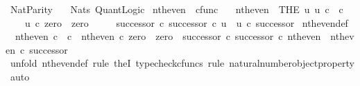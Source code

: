 %
\begin{isabellebody}%
%
%
\isadelimtheory
%
\endisadelimtheory
%
\isatagtheory
{}\isamarkupfalse%
\ Nat{\isacharunderscore}{\kern0pt}Parity\isanewline
\ \ \ Nats\ Quant{\isacharunderscore}{\kern0pt}Logic\isanewline
{}%
\endisatagtheory
{\isafoldtheory}%
%
\isadelimtheory
%
\endisadelimtheory
%
\isadelimdocument
%
\endisadelimdocument
%
\isatagdocument
%
\isamarkuptrue%
%
\endisatagdocument
{\isafolddocument}%
%
\isadelimdocument
%
\endisadelimdocument
{}\isamarkupfalse%
\ nth{\isacharunderscore}{\kern0pt}even\ {\isacharcolon}{\kern0pt}{\isacharcolon}{\kern0pt}\ {\isachardoublequoteopen}cfunc{\isachardoublequoteclose}\ \isanewline
\ \ {\isachardoublequoteopen}nth{\isacharunderscore}{\kern0pt}even\ {\isacharequal}{\kern0pt}\ {\isacharparenleft}{\kern0pt}THE\ u{\isachardot}{\kern0pt}\ u{\isacharcolon}{\kern0pt}\ {\isasymnat}\isactrlsub c\ {\isasymrightarrow}\ {\isasymnat}\isactrlsub c\ {\isasymand}\ \isanewline
\ \ \ \ u\ {\isasymcirc}\isactrlsub c\ zero\ {\isacharequal}{\kern0pt}\ zero\ {\isasymand}\isanewline
\ \ \ \ {\isacharparenleft}{\kern0pt}successor\ {\isasymcirc}\isactrlsub c\ successor{\isacharparenright}{\kern0pt}\ {\isasymcirc}\isactrlsub c\ u\ {\isacharequal}{\kern0pt}\ u\ {\isasymcirc}\isactrlsub c\ successor{\isacharparenright}{\kern0pt}{\isachardoublequoteclose}\isanewline
\isanewline
{}\isamarkupfalse%
\ nth{\isacharunderscore}{\kern0pt}even{\isacharunderscore}{\kern0pt}def{}{\isacharcolon}{\kern0pt}\isanewline
\ \ {\isachardoublequoteopen}nth{\isacharunderscore}{\kern0pt}even{\isacharcolon}{\kern0pt}\ {\isasymnat}\isactrlsub c\ {\isasymrightarrow}\ {\isasymnat}\isactrlsub c\ {\isasymand}\ nth{\isacharunderscore}{\kern0pt}even\ {\isasymcirc}\isactrlsub c\ zero\ {\isacharequal}{\kern0pt}\ zero\ {\isasymand}\ {\isacharparenleft}{\kern0pt}successor\ {\isasymcirc}\isactrlsub c\ successor{\isacharparenright}{\kern0pt}\ {\isasymcirc}\isactrlsub c\ nth{\isacharunderscore}{\kern0pt}even\ {\isacharequal}{\kern0pt}\ nth{\isacharunderscore}{\kern0pt}even\ {\isasymcirc}\isactrlsub c\ successor{\isachardoublequoteclose}\isanewline
%
\isadelimproof
\ \ %
\endisadelimproof
%
\isatagproof
{}\isamarkupfalse%
\ {\isacharparenleft}{\kern0pt}unfold\ nth{\isacharunderscore}{\kern0pt}even{\isacharunderscore}{\kern0pt}def{\isacharcomma}{\kern0pt}\ rule\ theI{\isacharprime}{\kern0pt}{\isacharcomma}{\kern0pt}\ typecheck{\isacharunderscore}{\kern0pt}cfuncs{\isacharcomma}{\kern0pt}\ rule\ natural{\isacharunderscore}{\kern0pt}number{\isacharunderscore}{\kern0pt}object{\isacharunderscore}{\kern0pt}property{}{\isacharcomma}{\kern0pt}\ auto{\isacharparenright}{\kern0pt}%

\end{isabellebody}
